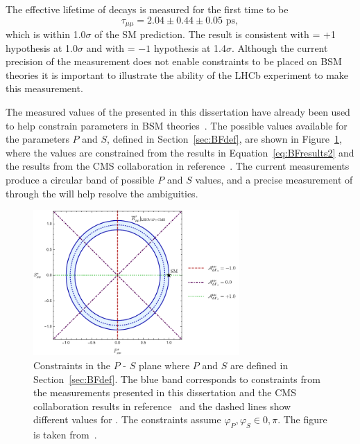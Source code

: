 The effective lifetime of \bsmumu decays is measured for the first time to be 
\begin{equation}
\tau_{\mu\mu} = 2.04 \pm 0.44 \pm 0.05 \text{ ps},
\end{equation}
which is within 1.0$\sigma$ of the SM prediction. The result is consistent with \ADG = +1 hypothesis at 1.0$\sigma$ and with \ADG = $-1$ hypothesis at 1.4$\sigma$. Although the current precision of the measurement does not enable constraints to be placed on BSM theories it is important to illustrate the ability of the LHCb experiment to make this measurement.

The measured values of the \BF presented in this dissertation have already been used to help constrain parameters in BSM theories~\cite{Altmannshofer:2017wqy,Fleischer:2017ltw,Bobeth:2017xry,Chiang:2017etj}. 
The possible values available for the parameters $P$ and $S$, defined in Section~\ref{sec:BFdef}, are shown in Figure~\ref{fig:NPcontss}, where the values are constrained from the \BF results in Equation~\ref{eq:BFresults2} and the results from the CMS collaboration in reference~\cite{Chatrchyan:2013bka}. The current measurements produce a circular band of possible $P$ and $S$ values, and a precise measurement of \ADG through the \bsmumu \el will help resolve the ambiguities.


\begin{figure}[tbp]
    \centering
        \includegraphics[width=0.7\textwidth]{./Figs/Summary/fig3.pdf}
    \caption{Constraints in the $P$ - $S$ plane where $P$ and $S$ are defined in Section~\ref{sec:BFdef}. The blue band corresponds to constraints from the \bmumu \BF measurements presented in this dissertation and the CMS collaboration results in reference~\cite{Chatrchyan:2013bka} and the dashed lines show different values for \ADG. The constraints assume $\varphi_{P}, \varphi_{S}\in {0, \pi}$. The figure is taken from~\cite{Fleischer:2017ltw}.}
    \label{fig:NPcontss}
\end{figure}



